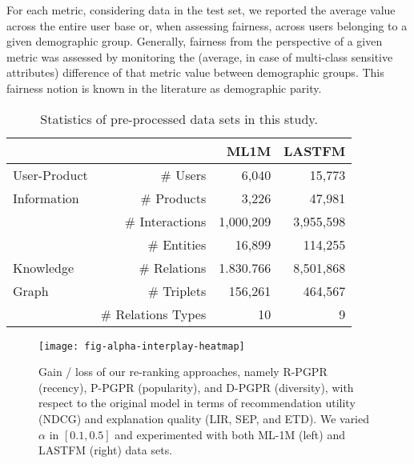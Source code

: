 \documentclass[sigconf]{acmart}
\begin{document}
For each metric, considering data in the test set, we reported the average value across the entire user base or, when assessing fairness, across users belonging to a given demographic group.
Generally, fairness from the perspective of a given metric was assessed by monitoring the (average, in case of multi-class sensitive attributes) difference of that metric value between demographic groups.
This fairness notion is known in the literature as demographic parity.

\begin{table}[!t]
  \caption{Statistics of pre-processed data sets in this study.}
  \label{tab:data-stats}
  \begin{tabular}{lrrr}
    \newline & \newline & \textbf{ML1M} & \textbf{LASTFM} \\
    \hline
    \toprule
    User-Product & \# Users & 6,040 & 15,773 \\
    Information & \# Products & 3,226 & 47,981 \\
    \newline & \# Interactions & 1,000,209 & 3,955,598 \\
    \hline
    \newline & \# Entities & 16,899 & 114,255 \\
    Knowledge & \# Relations & 1.830.766 & 8,501,868 \\
    Graph & \# Triplets & 156,261 & 464,567 \\
    \newline & \# Relations Types & 10 & 9 \\
    \bottomrule
  \end{tabular}
\end{table}

\begin{figure}[!t]
\centering
\texttt{[image: fig-alpha-interplay-heatmap]}
\caption{{\color{black}Gain / loss of our re-ranking approaches, namely R-PGPR (recency), P-PGPR (popularity), and D-PGPR (diversity), with respect to the original model} in terms of recommendation utility (NDCG) and explanation quality (LIR, SEP, and ETD). We varied $\alpha$ in $[0.1, 0.5]$ and experimented with both ML-1M (left) and LASTFM (right) data sets.}
\label{fig:satt-sopt}
\end{figure}
\end{document}

